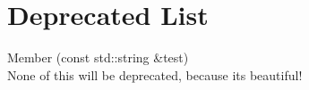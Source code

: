 \chapter{Deprecated List}
\hypertarget{deprecated}{}\label{deprecated}

\begin{DoxyRefList}
\item[Member \doxylink{class_my_library_1_1_example_a1c0046b0674eb4cad09c5d3e943912b8}{My\+Library\+::Example\+::test} (const std\+::string \&test)]\hfill \\
\label{deprecated__deprecated000001}%
%
None of this will be deprecated, because it\textquotesingle{}s beautiful!
\end{DoxyRefList}